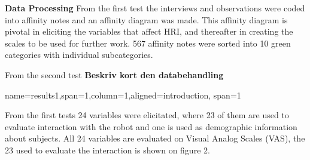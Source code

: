 \documentclass[paperwidth=160cm,paperheight=100cm,landscape,fontscale=0.3010]{baposter}
\begin{document}
\begin{poster}
{\textbf{Data Processing}
From the first test the interviews and observations were coded into affinity notes and an affinity diagram was made. This affinity diagram is pivotal in eliciting the variables that affect HRI, and thereafter in creating the scales to be used for further work. 
567 affinity notes were sorted into 10 green categories with individual subcategories. 

From the second test \textbf{Beskriv kort den databehandling}
}


{name=results1,span=1,column=1,aligned=introduction, span=1}
{\parskip 5pt 
From the first tests 24 variables were elicitated, where 23 of them are used to evaluate interaction with the robot and one is used as demographic information about subjects. All 24 variables are evaluated on Visual Analog Scales (VAS), the 23 used to evaluate the interaction is shown on figure 2.
  
}
\end{poster}
\end{document}
